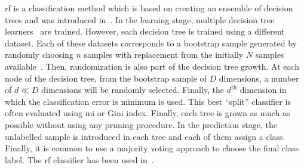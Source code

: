 \begin{enumerate}[leftmargin=*]
  \Ac{rf} is a classification method which is based on creating an ensemble of
  decision trees and was introduced in~\cite{Breiman2001}.
  In the learning stage, multiple decision tree learners~\cite{Breiman1984} are
  trained.
  However, each decision tree is trained using a different dataset.
  Each of these datasets corresponds to a bootstrap sample generated by
  randomly choosing $n$ samples with replacement from the initially $N$ samples
  available~\cite{Efron1979}.
  Then, randomization is also part of the decision tree growth.
  At each node of the decision tree, from the bootstrap sample of $D$
  dimensions, a number of $d \ll D$ dimensions will be randomly selected.
  Finally, the $d^{\text{th}}$ dimension in which the classification error is
  minimum is used.
  This best ``split'' classifier is often evaluated using \ac{mi} or Gini index.
  Finally, each tree is grown as much as possible without using any pruning
  procedure.
  In the prediction stage, the unlabelled sample is introduced in each tree and
  each of them assign a class.
  Finally, it is common to use a majority voting approach to choose the final
  class label.
  The \ac{rf} classifier has been used
  in~\cite{Kelm2007,Litjens2014,Tiwari2012,Tiwari2013,Viswanath2009,trigui2017automatic,trigui2016classification,samarasinghe2016semi,rampun2015classifying,rampun2016computerb,rampun2015computer,rampun2016computer,Lemaitre2016thesis}.


\end{enumerate}
